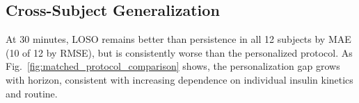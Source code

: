 \documentclass[journal]{IEEEtran}
\begin{document}
\subsection{Cross-Subject Generalization}

At 30 minutes, LOSO remains better than persistence in all 12 subjects by MAE (10 of 12 by RMSE), but is consistently worse than the personalized protocol. As Fig.~\ref{fig:matched_protocol_comparison} shows, the personalization gap grows with horizon, consistent with increasing dependence on individual insulin kinetics and routine.

\losotable
{}\of\maetable \global\let\persA=\pgfplotsretval
{}\of\maetable \global\let\persB=\pgfplotsretval
{}\of\maetable \global\let\persC=\pgfplotsretval
{}\of\maetable \global\let\persD=\pgfplotsretval
{}\of\maetable \global\let\persoA=\pgfplotsretval
{}\of\maetable \global\let\persoB=\pgfplotsretval
{}\of\maetable \global\let\persoC=\pgfplotsretval
{}\of\maetable \global\let\persoD=\pgfplotsretval
{}\of\losotable \global\let\losoA=\pgfplotsretval
{}\of\losotable \global\let\losoB=\pgfplotsretval
{}\of\losotable \global\let\losoC=\pgfplotsretval
{}\of\losotable \global\let\losoD=\pgfplotsretval
\end{document}
